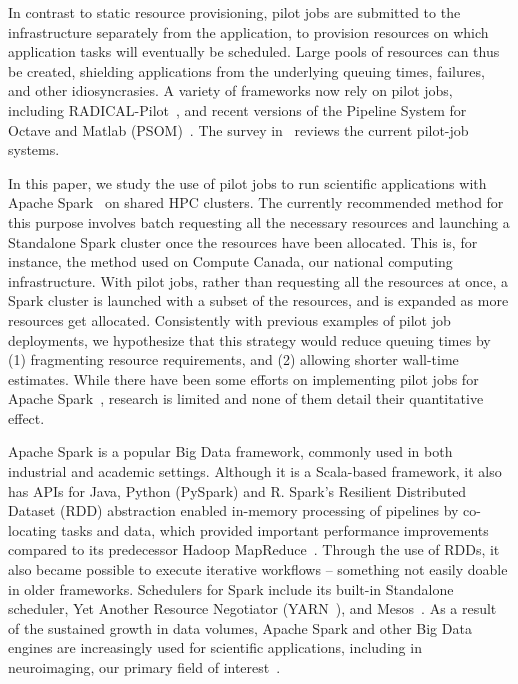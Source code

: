     In contrast to static resource provisioning, pilot jobs are submitted to the
    infrastructure separately from the application, to provision resources on
    which application tasks will eventually be scheduled. Large pools of
    resources can thus be created, shielding applications from the underlying
    queuing times, failures, and other idiosyncrasies. A variety of frameworks
    now rely on pilot jobs, including RADICAL-Pilot~\cite{merzky2015radical},
    and recent versions of the Pipeline System for Octave and Matlab
    (PSOM)~\cite{bellec2012pipeline}. The survey
    in~\cite{turilli2018comprehensive} reviews the current pilot-job systems.
    
    In this paper, we study the use of pilot jobs to run scientific applications
    with Apache Spark~\cite{zaharia2016apache} on shared HPC clusters. The
    currently recommended method for this purpose involves batch requesting all
    the necessary resources and launching a Standalone Spark cluster once the
    resources have been allocated. This is, for instance, the method used on
    Compute Canada, our national computing infrastructure. With pilot jobs,
    rather than requesting all the resources at once, a Spark cluster is
    launched with a subset of the resources, and is expanded as more resources
    get allocated. Consistently with previous examples of pilot job deployments,
    we hypothesize that this strategy would reduce queuing times by (1)
    fragmenting resource requirements, and (2) allowing shorter wall-time
    estimates. While there have been some efforts on implementing pilot jobs for
    Apache Spark~\cite{luckow2016hadoop}, research is limited and none of them
    detail their quantitative effect.
    
    Apache Spark is a popular Big Data framework, commonly used in both
    industrial and academic settings. Although it is a Scala-based framework, it
    also has APIs for Java, Python (PySpark) and R. Spark's Resilient
    Distributed Dataset (RDD) abstraction enabled in-memory processing of
    pipelines by co-locating tasks and data, which provided important
    performance improvements compared to its predecessor Hadoop
    MapReduce~\cite{dean2008mapreduce}. Through the use of RDDs, it also became
    possible to execute iterative workflows -- something not easily doable in
    older frameworks. Schedulers for Spark include its built-in Standalone
    scheduler, Yet Another Resource Negotiator (YARN~\cite{apache13yet}), and
    Mesos~\cite{hindman2011mesos}. As a result of the sustained growth in data
    volumes, Apache Spark and other Big Data engines are increasingly used for
    scientific applications, including in neuroimaging, our primary field of
    interest~\cite{boubela2016big,mehta2017comparative,freeman2014mapping}.
    
